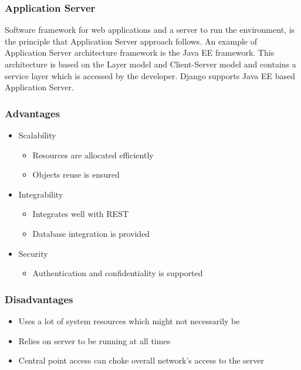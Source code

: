 \documentclass{article}
\begin{document}
	\subsubsection{Application Server}\label{subsec: ApplicationServer}
	Software framework for web applications and a server to run the environment, is the principle that Application Server approach follows. An example of Application Server architecture framework is the Java EE framework. This architecture is based on the Layer model and Client-Server model and contains a service layer which is accessed by the developer.
	Django supports Java EE based Application Server.
	
	\subsubsection{Advantages}
	\begin{itemize}
	\item Scalability 
		\begin{itemize}
		\item Resources are allocated efficiently
		\item Objects reuse is ensured
		\end{itemize}
	\item Integrability
		\begin{itemize}
			\item Integrates well with REST
			\item Database integration is provided
		\end{itemize}
	\item Security
		\begin{itemize}
		\item Authentication and confidentiality is supported
		\end{itemize}
	\end{itemize}
	
	\subsubsection{Disadvantages}
	\begin{itemize}
	\item Uses a lot of system resources which might not necessarily be 
	\item Relies on server to be running at all times 
	\item Central point access can choke overall network's access to the server
	
	\end{itemize}
\end{document}
